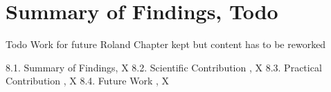 \section{Summary of Findings, Todo}

Todo
Work for future Roland
Chapter kept but content has to be reworked


    8.1. Summary of Findings, X
    8.2. Scientific Contribution , X
    8.3. Practical Contribution , X
    8.4. Future Work , X
